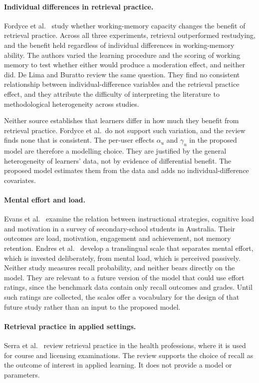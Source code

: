 \paragraph{Individual differences in retrieval practice.}
Fordyce et al.\ \cite{fordyce2025individual} study whether working-memory capacity changes the benefit of
retrieval practice. Across all three experiments, retrieval outperformed restudying, and the benefit held
regardless of individual differences in working-memory ability. The authors varied the learning procedure and
the scoring of working memory to test whether either would produce a moderation effect, and neither did.
De Lima and Buratto \cite{delima2024retrieval} review the same question. They find no consistent relationship
between individual-difference variables and the retrieval practice effect, and they attribute the difficulty of
interpreting the literature to methodological heterogeneity across studies.

Neither source establishes that learners differ in how much they benefit from retrieval practice. Fordyce et al.\
do not support such variation, and the review finds none that is consistent. The per-user effects $\alpha_u$ and
$\gamma_u$ in the proposed model are therefore a modelling choice. They are justified by the general heterogeneity
of learners' data, not by evidence of differential benefit. The proposed model estimates them from the data and
adds no individual-difference covariates.

\paragraph{Mental effort and load.}
Evans et al.\ \cite{evans2024cognitive} examine the relation between instructional strategies, cognitive
load and motivation in a survey of secondary-school students in Australia. Their outcomes are
load, motivation, engagement and achievement, not memory retention. Endres et al.\ \cite{endres2025developing}
develop a translingual scale that separates mental effort, which is invested deliberately, from mental load,
which is perceived passively. Neither study measures recall probability, and neither bears directly on the
model. They are relevant to a future version of the model that could use effort ratings, since the benchmark
data contain only recall outcomes and grades. Until such ratings are collected, the scales offer a
vocabulary for the design of that future study rather than an input to the proposed model.

\paragraph{Retrieval practice in applied settings.}
Serra et al.\ \cite{serra2025retrieval} review retrieval practice in the health professions, where it is used
for course and licensing examinations. The review supports the choice of recall as the outcome of interest in
applied learning. It does not provide a model or parameters.

